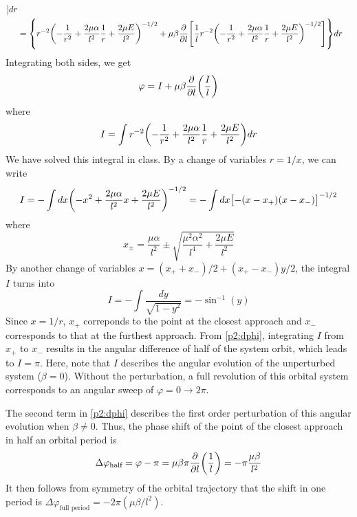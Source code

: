 \documentclass[12pt]{article}
\begin{document}
\begin{problem}{2}
\begin{solution}
\begin{align}
            ]dr\notag\\
            &=\qty{r^{-2}\qty(-\frac1{r^2}+\frac{2\mu\alpha}{l^2}\frac1r
                +\frac{2\mu E}{l^2})^{-1/2}
            +\mu\beta\frac{\partial}{\partial l}\qty[\frac1l
                r^{-2}\qty(-\frac1{r^2}+\frac{2\mu\alpha}{l^2}\frac1r
                +\frac{2\mu E}{l^2})^{-1/2}
            ]
            }dr
        \end{align}
        Integrating both sides, we get
        \begin{equation}\label{p2:dphi}
            \varphi=I+\mu\beta\frac{\partial}{\partial l}\qty(\frac{I}{l}) 
        \end{equation}
        where
        \begin{equation}
            I=\int
                r^{-2}\qty(-\frac1{r^2}+\frac{2\mu\alpha}{l^2}\frac1r+\frac{2\mu
                E}{l^2})dr
        \end{equation}
        We have solved this integral in class. By a change of variables $r=1/x$,
        we can write
        \begin{equation}
            I=-\int dx\qty(-x^2+\frac{2\mu\alpha}{l^2}x+\frac{2\mu
            E}{l^2})^{-1/2}
            =-\int dx\qty[-(x-x_+)(x-x_-)]^{-1/2}
        \end{equation}
        where
        \begin{equation}
            x_\pm=\frac{\mu\alpha}{l^2}
                \pm\sqrt{\frac{\mu^2\alpha^2}{l^4}+\frac{2\mu E}{l^2}} 
        \end{equation}
        By another change of variables $x=(x_++x_-)/2+(x_+-x_-)y/2$, the
        integral $I$ turns into
        \begin{equation}
            I=-\int\frac{dy}{\sqrt{1-y^2}}=-\sin^{-1}(y)
        \end{equation}
        Since $x=1/r$, $x_+$ correponds to the point at the closest approach and
        $x_-$ corresponds to that at the furthest approach. From
        \eqref{p2:dphi}, integrating $I$ from $x_+$ to $x_-$ results in the
        angular difference of half of the system orbit, which leads to $I=\pi$.
        Here, note that $I$ describes the angular evolution of the unperturbed
        system ($\beta=0$). Without the perturbation, a full revolution of this
        orbital system corresponds to an angular sweep of $\varphi=0\to2\pi$.
        
        The second term in \eqref{p2:dphi} describes the first order
        perturbation of this angular evolution when $\beta\neq0$. Thus, the
        phase shift of the point of the closest approach in half an orbital 
        period is
        \begin{equation}
            \Delta\varphi_{\text{half}}
            =\varphi-\pi=\mu\beta\pi\frac{\partial}{\partial
            l}\qty(\frac1l)=-\pi\frac{\mu\beta}{l^2}
        \end{equation}
        It then follows from symmetry of the orbital trajectory that the shift 
        in one period is
        $\Delta\varphi_{\text{full period}}=-2\pi(\mu\beta/l^2)$.
    \end{solution}
\end{problem}
\end{document}
